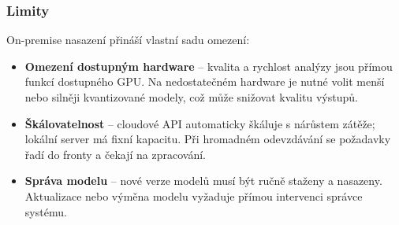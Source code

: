 \begin{table}[H]
    \centering
    \caption{Přibližné hardwarové nároky open-source modelů pro on-premise nasazení. Hodnoty jsou orientační a závisí na konkrétní architektuře modelu. Nezahrnují paměť nutnou pro KV cache.}
    \label{tab:on-premise-hardware}
\end{table}

\subsubsection*{Limity}

On-premise nasazení přináší vlastní sadu omezení:

\begin{itemize}
    \item \textbf{Omezení dostupným hardware} -- kvalita a rychlost analýzy jsou přímou funkcí dostupného GPU.
    Na nedostatečném hardware je nutné volit menší nebo silněji kvantizované modely, což může snižovat kvalitu výstupů.

    \item \textbf{Škálovatelnost} -- cloudové API automaticky škáluje s nárůstem zátěže; lokální server má fixní kapacitu.
    Při hromadném odevzdávání se požadavky řadí do fronty a čekají na zpracování.

    \item \textbf{Správa modelu} -- nové verze modelů musí být ručně staženy a nasazeny.
    Aktualizace nebo výměna modelu vyžaduje přímou intervenci správce systému.
\end{itemize}

